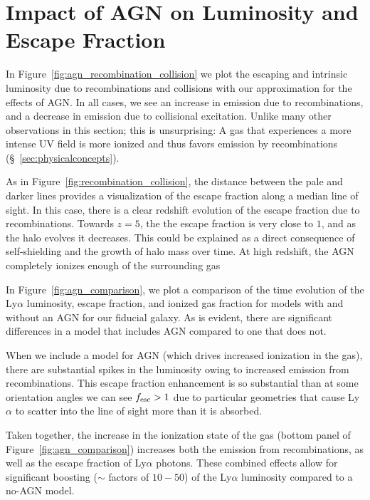 \section{Impact of AGN on Luminosity and Escape Fraction}
In Figure~\ref{fig:agn_recombination_collision} we plot the escaping and intrinsic luminosity due to recombinations and collisions with our approximation for the effects of AGN.
In all cases, we see an increase in emission due to recombinations, and a decrease in emission due to collisional excitation.
Unlike many other observations in this section; this is unsurprising: A gas that experiences a more intense UV field is more ionized and thus favors emission by recombinations (\S~\ref{sec:physicalconcepts}).

As in Figure~\ref{fig:recombination_collision}, the distance between the pale and darker lines provides a visualization of the escape fraction along a median line of sight.
In this case, there is a clear redshift evolution of the escape fraction due to recombinations.
Towards $z=5$, the the escape fraction is very close to $1$, and as the halo evolves it decreases.
This could be explained as a direct consequence of self-shielding and the growth of halo mass over time.
At high redshift, the AGN completely ionizes enough of the surrounding gas 


In Figure~\ref{fig:agn_comparison}, we plot a comparison of the time evolution of the Ly$\alpha$ luminosity, escape fraction, and ionized gas fraction for models with and without an AGN for our fiducial galaxy.
As is evident, there are significant differences in a model that includes AGN compared to one that does not.

When we include a model for AGN (which drives increased ionization in the gas), there are substantial spikes in the luminosity owing to increased emission from recombinations.
This escape fraction enhancement is so substantial than at some orientation angles we can see $f_{\rm esc} > 1$ due to particular geometries that cause Ly$\alpha$ to scatter into the line of sight more than it is absorbed.

Taken together, the increase in the ionization state of the gas (bottom panel of Figure~\ref{fig:agn_comparison}) increases both the emission from recombinations, as well as the escape fraction of Ly$\alpha$ photons.
These combined effects allow for significant boosting ($\sim$ factors of $10-50$) of the Ly$\alpha$ luminosity compared to a no-AGN model.



